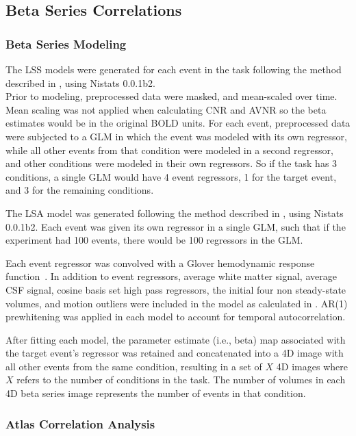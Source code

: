 \documentclass[phd,appendix,figures]{uithesis}
\begin{document}
\subsection*{Beta Series Correlations}
\label{methods:bsc}

\subsubsection*{Beta Series Modeling}
\label{methods:bsc_model}

The LSS models were generated for each event in
the task following the method described in \cite[Turner (2012)]{Turner2012a}, using
Nistats 0.0.1b2.\\
Prior to modeling, preprocessed data were masked, and mean-scaled over
time.
Mean scaling was not applied when calculating CNR and AVNR so the
beta estimates would be in the original BOLD units.
For each event, preprocessed data were subjected to a GLM
in which the event was modeled with its own regressor, while
all other events from that condition were modeled in a second regressor,
and other conditions were modeled in their own regressors.
So if the task has 3 conditions, 
a single GLM would have 4 event regressors, 1 for the target
event, and 3 for the remaining conditions.

The LSA model was generated following the method described in
\cite[Rissman (2004)]{Rissman2004}, using Nistats 0.0.1b2.
Each event was given its own regressor in a single GLM, such that
if the experiment had 100 events, there would be 100 regressors in the GLM.

Each event regressor was convolved with a Glover hemodynamic response
function~\cite{Glover1999}.
In addition to event regressors, average white matter signal, average CSF signal,
cosine basis set high pass regressors, the initial four non steady-state volumes, 
and motion outliers were included
in the model as calculated in .
AR(1) prewhitening was applied in each model to account
for temporal autocorrelation.

After fitting each model, the parameter estimate (i.e., beta) map
associated with the target event's regressor was retained and
concatenated into a 4D image with all other events from the same
condition, resulting in a set of $X$ 4D images where $X$ refers to the
number of conditions in the task.
The number of volumes in each 4D beta series image
represents the number of events in that condition.

\subsubsection*{Atlas Correlation Analysis}
\label{methods:atlas-corr-analysis}
\end{document}
